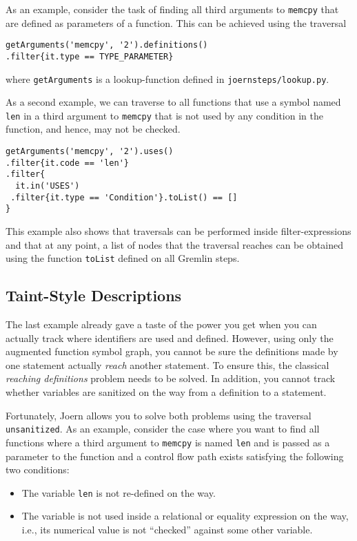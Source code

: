 \documentclass[a4paper]{article}
\newcommand{\code}[1]{\texttt{\small #1}}
\begin{document}
As an example, consider the task of finding all third arguments to
\code{memcpy} that are defined as parameters of a function. This can
be achieved using the traversal
\begin{verbatim}
getArguments('memcpy', '2').definitions()
.filter{it.type == TYPE_PARAMETER}
\end{verbatim}
where \code{getArguments} is a lookup-function defined in
\code{joernsteps/lookup.py}.

As a second example, we can traverse to all functions that use a
symbol named \code{len} in a third argument to \code{memcpy} that is
not used by any condition in the function, and hence, may not be
checked.

\begin{verbatim}
getArguments('memcpy', '2').uses()
.filter{it.code == 'len'}
.filter{
  it.in('USES')
 .filter{it.type == 'Condition'}.toList() == []
}
\end{verbatim}

This example also shows that traversals can be performed inside
filter-expressions and that at any point, a list of nodes that the
traversal reaches can be obtained using the function \code{toList}
defined on all Gremlin steps.

\subsection{Taint-Style Descriptions}
\label{sec:taint}

The last example already gave a taste of the power you get when you
can actually track where identifiers are used and defined. However,
using only the augmented function symbol graph, you cannot be sure the
definitions made by one statement actually \emph{reach} another
statement. To ensure this, the classical \emph{reaching definitions}
problem needs to be solved. In addition, you cannot track whether
variables are sanitized on the way from a definition to a statement.

Fortunately, Joern allows you to solve both problems using the
traversal \code{unsanitized}. As an example, consider the case where
you want to find all functions where a third argument to \code{memcpy}
is named \code{len} and is passed as a parameter to the function and a
control flow path exists satisfying the following two conditions:

\begin{itemize}
  \item The variable \code{len} is not re-defined on the way.
  \item The variable is not used inside a relational or equality
    expression on the way, i.e., its numerical value is not
    ``checked'' against some other variable.
\end{itemize}
\end{document}
